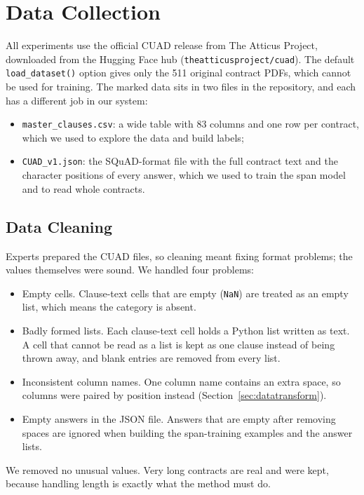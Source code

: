 \section{Data Collection}
\label{sec:datasource}
All experiments use the official CUAD release from The Atticus Project, downloaded from the Hugging Face hub (\texttt{theatticusproject/cuad}). The default \texttt{load\_dataset()} option gives only the 511 original contract PDFs, which cannot be used for training. The marked data sits in two files in the repository, and each has a different job in our system:
\begin{itemize}[itemsep=2pt]
  \item \texttt{master\_clauses.csv}: a wide table with 83 columns and one row per contract, which we used to explore the data and build labels;
  \item \texttt{CUAD\_v1.json}: the SQuAD-format file with the full contract text and the character positions of every answer, which we used to train the span model and to read whole contracts.
\end{itemize}

\subsection{Data Cleaning}
Experts prepared the CUAD files, so cleaning meant fixing format problems; the values themselves were sound. We handled four problems:
\begin{itemize}[itemsep=2pt]
  \item Empty cells. Clause-text cells that are empty (\texttt{NaN}) are treated as an empty list, which means the category is absent.
  \item Badly formed lists. Each clause-text cell holds a Python list written as text. A cell that cannot be read as a list is kept as one clause instead of being thrown away, and blank entries are removed from every list.
  \item Inconsistent column names. One column name contains an extra space, so columns were paired by position instead (Section~\ref{sec:datatransform}).
  \item Empty answers in the JSON file. Answers that are empty after removing spaces are ignored when building the span-training examples and the answer lists.
\end{itemize}
We removed no unusual values. Very long contracts are real and were kept, because handling length is exactly what the method must do.


